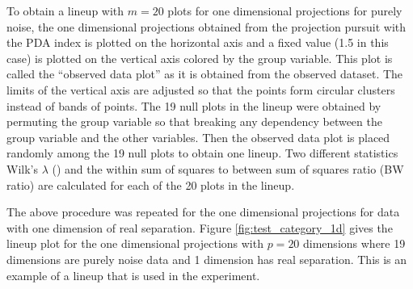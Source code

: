 \documentclass[12]{article}
\begin{document}
To obtain a lineup with $m = 20$ plots for one dimensional projections for purely noise, the one dimensional projections obtained from the projection pursuit with the PDA index is plotted on the horizontal axis and a fixed value (1.5 in this case) is plotted on the vertical axis colored by the group variable. This plot is called the ``observed data plot'' as it is obtained from the observed dataset. The limits of the vertical axis are adjusted so that the points form circular clusters instead of bands of points. The 19 null plots in the lineup were obtained by  permuting the group variable so that breaking any dependency between the group variable and the other variables. Then the observed data plot is placed randomly among the 19 null plots to obtain one lineup. Two different statistics Wilk's $\lambda$ (\cite{JW02})  and the within sum of squares to between sum of squares ratio (BW ratio) are calculated for each of the 20 plots in the lineup. 

The above procedure was repeated for the one dimensional projections for data with one dimension of real separation. Figure \ref{fig:test_category_1d} gives the lineup plot for the one dimensional projections with $p = 20$ dimensions where 19 dimensions are purely noise data and 1 dimension has real separation. This is an example of a lineup that is used in the experiment. 

\end{document}
